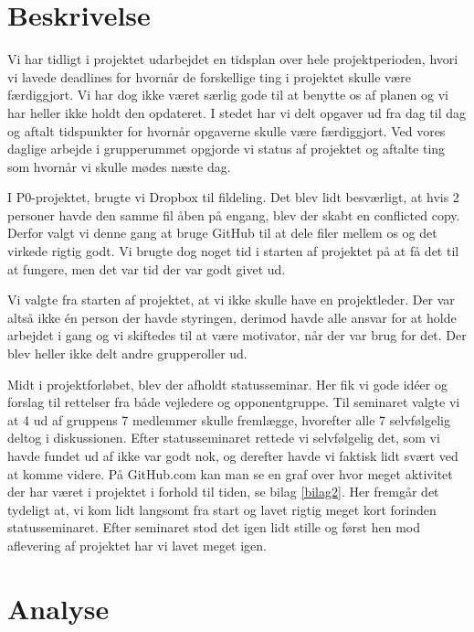 \section{Beskrivelse}
Vi har tidligt i projektet udarbejdet en tidsplan over hele projektperioden, hvori vi lavede deadlines for hvornår de forskellige ting i projektet skulle være færdiggjort. Vi har dog ikke været særlig gode til at benytte os af planen og vi har heller ikke holdt den opdateret. I stedet har vi delt opgaver ud fra dag til dag og aftalt tidspunkter for hvornår opgaverne skulle være færdiggjort. Ved vores daglige arbejde i grupperummet opgjorde vi status af projektet og aftalte ting som hvornår vi skulle mødes næste dag. 

I P0-projektet, brugte vi Dropbox til fildeling. Det blev lidt besværligt, at hvis 2 personer havde den samme fil åben på engang, blev der skabt en conflicted copy. Derfor valgt vi denne gang at bruge GitHub til at dele filer mellem os og det virkede rigtig godt. Vi brugte dog noget tid i starten af projektet på at få det til at fungere, men det var tid der var godt givet ud. 

Vi valgte fra starten af projektet, at vi ikke skulle have en projektleder. Der var altså ikke én person der havde styringen, derimod havde alle ansvar for at holde arbejdet i gang og vi skiftedes til at være motivator, når der var brug for det. Der blev heller ikke delt andre grupperoller ud.  

Midt i projektforløbet, blev der afholdt statusseminar. Her fik vi gode idéer og forslag til rettelser fra både vejledere og opponentgruppe. Til seminaret valgte vi at 4 ud af gruppens 7 medlemmer skulle fremlægge, hvorefter alle 7 selvfølgelig deltog i diskussionen. Efter statusseminaret rettede vi selvfølgelig det, som vi havde fundet ud af ikke var godt nok, og derefter havde vi faktisk lidt svært ved at komme videre. På GitHub.com kan man se en graf over hvor meget aktivitet der har været i projektet i forhold til tiden, se bilag \ref{bilag2}. Her fremgår det tydeligt at, vi kom lidt langsomt fra start og lavet rigtig meget kort forinden statusseminaret. Efter seminaret stod det igen lidt stille og først hen mod aflevering af projektet har vi lavet meget igen. 

\section{Analyse}

